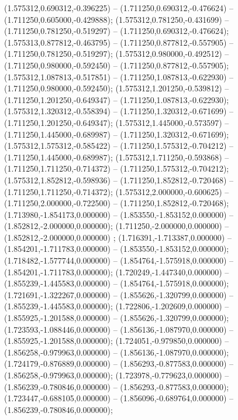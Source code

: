  (1.575312,0.690312,-0.396225) -- (1.711250,0.690312,-0.476624) -- (1.711250,0.605000,-0.429888);
 (1.575312,0.781250,-0.431699) -- (1.711250,0.781250,-0.519297) -- (1.711250,0.690312,-0.476624);
 (1.575313,0.877812,-0.463795) -- (1.711250,0.877812,-0.557905) -- (1.711250,0.781250,-0.519297);
 (1.575312,0.980000,-0.492512) -- (1.711250,0.980000,-0.592450) -- (1.711250,0.877812,-0.557905);
 (1.575312,1.087813,-0.517851) -- (1.711250,1.087813,-0.622930) -- (1.711250,0.980000,-0.592450);
 (1.575312,1.201250,-0.539812) -- (1.711250,1.201250,-0.649347) -- (1.711250,1.087813,-0.622930);
 (1.575312,1.320312,-0.558394) -- (1.711250,1.320312,-0.671699) -- (1.711250,1.201250,-0.649347);
 (1.575312,1.445000,-0.573597) -- (1.711250,1.445000,-0.689987) -- (1.711250,1.320312,-0.671699);
 (1.575312,1.575312,-0.585422) -- (1.711250,1.575312,-0.704212) -- (1.711250,1.445000,-0.689987);
 (1.575312,1.711250,-0.593868) -- (1.711250,1.711250,-0.714372) -- (1.711250,1.575312,-0.704212);
 (1.575312,1.852812,-0.598936) -- (1.711250,1.852812,-0.720468) -- (1.711250,1.711250,-0.714372);
 (1.575312,2.000000,-0.600625) -- (1.711250,2.000000,-0.722500) -- (1.711250,1.852812,-0.720468);
 (1.713980,-1.854173,0.000000) -- (1.853550,-1.853152,0.000000) -- (1.852812,-2.000000,0.000000);
 (1.711250,-2.000000,0.000000) -- (1.852812,-2.000000,0.000000) ;
 (1.716391,-1.713387,0.000000) -- (1.854201,-1.711783,0.000000) -- (1.853550,-1.853152,0.000000);
 (1.718482,-1.577744,0.000000) -- (1.854764,-1.575918,0.000000) -- (1.854201,-1.711783,0.000000);
 (1.720249,-1.447340,0.000000) -- (1.855239,-1.445583,0.000000) -- (1.854764,-1.575918,0.000000);
 (1.721691,-1.322267,0.000000) -- (1.855626,-1.320799,0.000000) -- (1.855239,-1.445583,0.000000);
 (1.722806,-1.202609,0.000000) -- (1.855925,-1.201588,0.000000) -- (1.855626,-1.320799,0.000000);
 (1.723593,-1.088446,0.000000) -- (1.856136,-1.087970,0.000000) -- (1.855925,-1.201588,0.000000);
 (1.724051,-0.979850,0.000000) -- (1.856258,-0.979963,0.000000) -- (1.856136,-1.087970,0.000000);
 (1.724179,-0.876889,0.000000) -- (1.856293,-0.877583,0.000000) -- (1.856258,-0.979963,0.000000);
 (1.723978,-0.779623,0.000000) -- (1.856239,-0.780846,0.000000) -- (1.856293,-0.877583,0.000000);
 (1.723447,-0.688105,0.000000) -- (1.856096,-0.689764,0.000000) -- (1.856239,-0.780846,0.000000);
